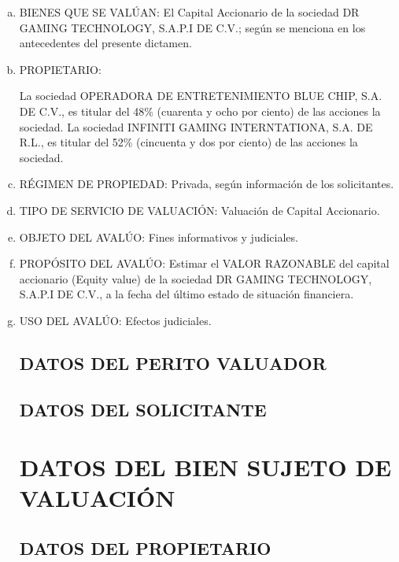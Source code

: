 \documentclass[10pt,letter]{report}
\begin{document}
\begin{enumerate}[a.]
\item BIENES QUE SE VALÚAN: El Capital Accionario de la sociedad DR GAMING TECHNOLOGY, S.A.P.I DE C.V.; según se menciona en los antecedentes del presente dictamen. 

\item PROPIETARIO: 

La sociedad OPERADORA DE ENTRETENIMIENTO BLUE CHIP, S.A. DE C.V., es titular del 48\% (cuarenta y ocho por ciento) de las acciones la sociedad.
La sociedad INFINITI GAMING INTERNTATIONA, S.A. DE R.L., es titular del 52\% (cincuenta y dos por ciento) de las acciones la sociedad.

\item RÉGIMEN DE PROPIEDAD: Privada, según información de los solicitantes.

\item TIPO DE SERVICIO DE VALUACIÓN: Valuación de Capital Accionario.

\item OBJETO DEL AVALÚO: Fines informativos y judiciales.

\item PROPÓSITO DEL AVALÚO: Estimar el VALOR RAZONABLE del capital accionario (Equity value) de la sociedad DR GAMING TECHNOLOGY, S.A.P.I DE C.V., a la fecha del último estado de situación financiera.

\item USO DEL AVALÚO: Efectos judiciales.




\section{DATOS DEL PERITO VALUADOR}\label{sec:a}


\section{DATOS DEL SOLICITANTE}\label{sec:b}


\espacio{3cm}

\chapter{DATOS DEL BIEN SUJETO DE VALUACI\'ON}\label{cap:2}
\thispagestyle{fancy}
\setcounter{section}{2}
\section{DATOS DEL PROPIETARIO}\label{sec:c}



\end{enumerate}
\end{document}
